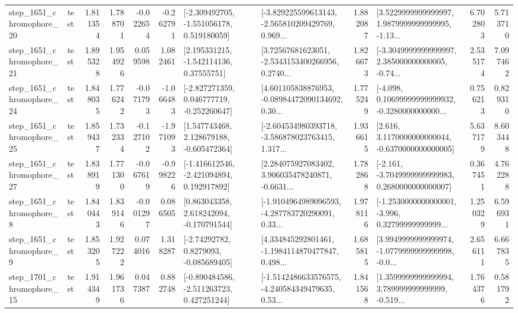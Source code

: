\begin{tabular}{llrrrrllrlrr}
 step\_1651\_chromophore\_20 &      test &      1.811354 &    1.788701 &     -0.022654 & -0.262791 &   [-2.309492705, -1.551056178, 0.519180059] &  [-3.829225599613143, -2.565810209429769, 0.969... &       1.882087 &  [3.5229999999999997, 1.9879999999999995, -1.13... &            6.702803 &          5.713710 \\
 step\_1651\_chromophore\_21 &      test &      1.895328 &    1.954926 &      0.059598 &  1.082461 &     [2.195331215, -1.542114136, 0.37555751] &  [3.72567681623051, -2.5343153400266956, 0.2740... &       1.826673 &  [-3.3049999999999997, 2.385000000000005, -0.74... &            2.535174 &          7.097462 \\
 step\_1651\_chromophore\_24 &      test &      1.848035 &    1.776242 &     -0.071793 & -1.066483 &   [-2.827271359, 0.046777719, -0.252260647] &  [4.601105838876953, -0.08984472090134692, 0.30... &       1.775249 &  [-4.098, 0.10699999999999932, -0.3280000000000... &            0.756213 &          0.829310 \\
 step\_1651\_chromophore\_25 &      test &      1.859437 &    1.732334 &     -0.127102 & -1.971093 &    [1.547743468, 2.128679188, -0.605472364] &  [-2.604534980393718, -3.586878023763415, 1.317... &       1.936615 &   [2.616, 3.1170000000000044, -0.6370000000000005] &            5.637179 &          8.603448 \\
 step\_1651\_chromophore\_27 &      test &      1.838919 &    1.771300 &     -0.067619 & -0.998226 &   [-1.416612546, -2.421094894, 0.192917892] &  [2.284075927083402, 3.906035478240871, -0.6631... &       1.782868 &  [-2.161, -3.7049999999999983, 0.2680000000000007] &            0.367451 &          4.762288 \\
  step\_1651\_chromophore\_8 &      test &      1.840443 &    1.839146 &     -0.001297 &  0.086505 &    [0.863043358, 2.618242094, -0.170791544] &  [-1.9104964989096593, -4.287783720290091, 0.33... &       1.978116 &  [-1.2530000000000001, -3.996, 0.32799999999999... &            1.250329 &          6.596931 \\
  step\_1651\_chromophore\_9 &      test &      1.853205 &    1.927222 &      0.074016 &  1.318287 &      [-2.74292782, 0.8279093, -0.085689405] &  [4.334845292801461, -1.1984114870477847, 0.498... &       1.685815 &  [3.9949999999999974, -1.0779999999999998, -0.0... &            2.656111 &          6.667835 \\
 step\_1701\_chromophore\_15 &      test &      1.914349 &    1.961736 &      0.047387 &  0.882748 &   [-0.890484586, -2.511263723, 0.427251244] &  [-1.5142486633576575, -4.240584349479635, 0.53... &       1.841568 &  [1.3599999999999994, 3.789999999999999, -0.519... &            1.764376 &          0.581792 \\

\end{tabular}

